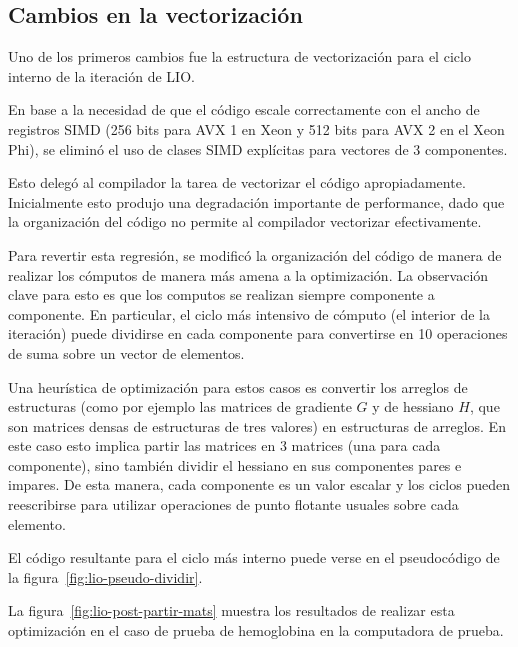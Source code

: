 \subsection{Cambios en la vectorizaci\'on}

Uno de los primeros cambios fue la estructura de vectorizaci\'on para el ciclo 
interno de la iteraci\'on de LIO.

En base a la necesidad de que el c\'odigo escale correctamente con el ancho de registros
SIMD (256 bits para AVX 1 en Xeon y 512 bits para AVX 2 en el Xeon Phi), se elimin\'o el
uso de clases SIMD expl\'icitas para vectores de 3 componentes. 

Esto deleg\'o al compilador la tarea de vectorizar el c\'odigo apropiadamente. Inicialmente
esto produjo una degradaci\'on importante de performance, dado que la organizaci\'on del
c\'odigo no permite al compilador vectorizar efectivamente. 

Para revertir esta regresi\'on, se modific\'o la organizaci\'on del c\'odigo de manera de
realizar los c\'omputos de manera m\'as amena a la optimizaci\'on. La observaci\'on clave
para esto es que los computos se realizan siempre componente a componente. En particular,
el ciclo m\'as intensivo de c\'omputo (el interior de la iteraci\'on) puede dividirse
en cada componente para convertirse en 10 operaciones de suma sobre un vector de
elementos. 

Una heur\'istica de optimizaci\'on para estos casos es convertir los arreglos de
estructuras (como por ejemplo las matrices de gradiente $G$ y de hessiano $H$, que
son matrices densas de estructuras de tres valores) en estructuras de arreglos.
En este caso esto implica partir las matrices en 3 matrices (una para cada
componente), sino tambi\'en dividir el hessiano en sus componentes pares e impares.
De esta manera, cada componente es un valor escalar y los ciclos pueden reescribirse
para utilizar operaciones de punto flotante usuales sobre cada elemento.

El c\'odigo resultante para el ciclo m\'as interno puede verse en el pseudoc\'odigo
de la figura~\ref{fig:lio-pseudo-dividir}. 


La figura~\ref{fig:lio-post-partir-mats} muestra los resultados de realizar esta
optimizaci\'on en el caso de prueba de hemoglobina en la computadora de prueba.


